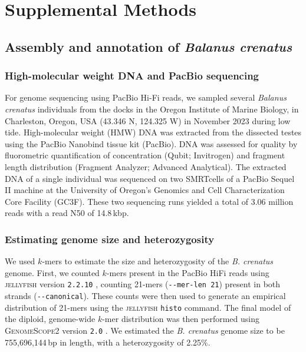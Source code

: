 \section*{Supplemental Methods}

\subsection*{Assembly and annotation of \textit{Balanus crenatus}}\label{sec:sup_methods_balcre}

\subsubsection*{High-molecular weight DNA and PacBio sequencing}

For genome sequencing using PacBio Hi-Fi reads, we sampled several \textit{Balanus
crenatus} individuals from the docks in the Oregon Institute of Marine Biology, in
Charleston, Oregon, USA (43.346 N, 124.325 W) in November 2023 during low tide.
High-molecular weight (HMW) DNA was extracted from the dissected testes using the 
PacBio Nanobind tissue kit (PacBio).
DNA was assessed for quality by fluorometric quantification of concentration (Qubit;
Invitrogen) and fragment length distribution (Fragment Analyzer; Advanced Analytical).
The extracted DNA of a single individual was sequenced on two SMRTcells of a PacBio
Sequel II machine at the University of Oregon's Genomics and Cell Characterization
Core Facility (GC3F).
These two sequencing runs yielded a total of 3.06 million reads with a read N50 of
14.8\,kbp.

\subsubsection*{Estimating genome size and heterozygosity}

We used $k$-mers to estimate the size and heterozygosity of the \textit{B.
crenatus} genome.
First, we counted $k$-mers present in the PacBio HiFi reads using
\textsc{jellyfish} version \texttt{2.2.10} \citep{marcais_fast_2011}, counting
21-mers (\texttt{-{}-mer-len 21}) present in both strands (\texttt{-{}-canonical}).
These counts were then used to generate an empirical distribution of 21-mers
using the \textsc{jellyfish} \texttt{histo} command.
The final model of the diploid, genome-wide $k$-mer distribution was then performed
using \textsc{GenomeScope2} version \texttt{2.0}
\citep{ranallo-benavidez_genomescope_2020}.
We estimated the \textit{B. crenatus} genome size to be 755{,}696{,}144\,bp in length,
with a heterozygosity of 2.25\%.

